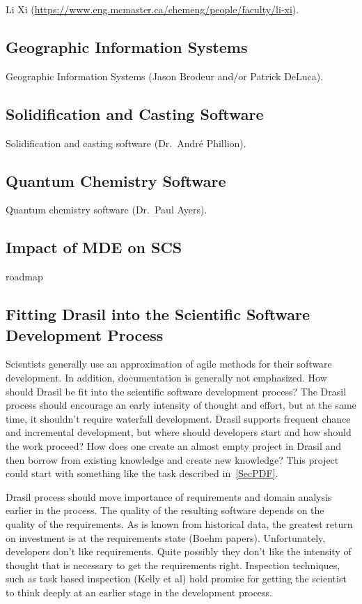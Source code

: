 \documentclass[12pt]{article}
\begin{document}
Li Xi (\url{https://www.eng.mcmaster.ca/chemeng/people/faculty/li-xi}).

\subsection{Geographic Information Systems}

Geographic Information Systems (Jason Brodeur and/or Patrick DeLuca).

\subsection{Solidification and Casting Software}

Solidification and casting software (Dr.\ Andr\'e Phillion).

\subsection{Quantum Chemistry Software}

Quantum chemistry software (Dr.\ Paul Ayers).

\subsection{Impact of MDE on SCS}

roadmap

\subsection{Fitting Drasil into the Scientific Software Development Process}

Scientists generally use an approximation of agile methods for their software
development.  In addition, documentation is generally not emphasized.  How
should Drasil be fit into the scientific software development process?  The
Drasil process should encourage an early intensity of thought and effort, but at
the same time, it shouldn't require waterfall development.  Drasil supports
frequent chance and incremental development, but where should developers start
and how should the work proceed?  How does one create an almost empty project in
Drasil and then borrow from existing knowledge and create new knowledge?  This
project could start with something like the task described in~\ref{SecPDF}.

Drasil process should move importance of requirements and domain analysis
earlier in the process.  The quality of the resulting software depends on the
quality of the requirements.  As is known from historical data, the greatest
return on investment is at the requirements state (Boehm papers).
Unfortunately, developers don't like requirements.  Quite possibly they don't
like the intensity of thought that is necessary to get the requirements right.
Inspection techniques, such as task based inspection (Kelly et al) hold promise
for getting the scientist to think deeply at an earlier stage in the development
process.
\end{document}
